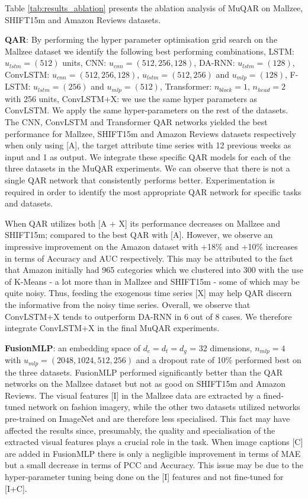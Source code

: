 \documentclass{article}
\begin{document}
Table \ref{tab:results_ablation} presents the ablation analysis of MuQAR on Mallzee, SHIFT15m and Amazon Reviews datasets. 

\textbf{QAR}: By performing the hyper parameter optimisation grid search on the Mallzee dataset we identify the following best performing combinations, LSTM: $u_{lstm}=(512)$ units, CNN: $u_{cnn}=(512, 256, 128)$, DA-RNN: $u_{lstm}=(128)$, ConvLSTM: $u_{cnn}=(512, 256, 128)$, $u_{lstm}=(512, 256)$ and $u_{mlp}=(128)$, F-LSTM: $u_{lstm}=(256)$ and $u_{mlp}=(512)$, Transformer: $n_{block}=1$, $n_{head}=2$ with 256 units, ConvLSTM+X: we use the same hyper parameters as ConvLSTM.
We apply the same hyper-parameters on the rest of the datasets.
The CNN, ConvLSTM and Transformer QAR networks yielded the best performance for Mallzee, SHIFT15m and Amazon Reviews datasets respectively when only using [A], the target attribute time series with 12 previous weeks as input and 1 as output. 
We integrate these specific QAR models for each of the three datasets in the MuQAR experiments. We can observe that there is not a single QAR network that consistently performs better. Experimentation is required in order to identify the most appropriate QAR network for specific tasks and datasets.

When QAR utilizes both [A + X] its performance decreases on Mallzee and SHIFT15m; compared to the best QAR with [A].
However, we observe an impressive improvement on the Amazon dataset with +18\% and +10\% increases in terms of Accuracy and AUC respectively. 
This may be attributed to the fact that Amazon initially had 965 categories which we clustered into 300 with the use of K-Means - a lot more than in Mallzee and SHIFT15m - some of which may be quite noisy. Thus, feeding the exogenous time series [X] may help QAR discern the informative from the noisy time series.
Overall, we observe that ConvLSTM+X tends to outperform DA-RNN in 6 out of 8 cases. We therefore integrate ConvLSTM+X in the final MuQAR experiments.

\textbf{FusionMLP}: an embedding space of $d_c=d_t=d_g$ = 32 dimensions, $n_{mlp}=4$ with $u_{mlp}=(2048, 1024, 512, 256)$ and a dropout rate of 10\% performed best on the three datasets.
FusionMLP performed significantly better than the QAR networks on the Mallzee dataset but not as good on SHIFT15m and Amazon Reviews.
The visual features [I] in the Mallzee data are extracted by a fined-tuned network on fashion imagery, while the other two datasets utilized networks pre-trained on ImageNet and are therefore less specialised. This fact may have affected the results since, presumably, the quality and specialisation of the extracted visual features plays a crucial role in the task.
When image captions [C] are added in FusionMLP there is only a negligible improvement in terms of MAE but a small decrease in terms of PCC and Accuracy. This issue may be due to the hyper-parameter tuning being done on the [I] features and not fine-tuned for [I+C].
\end{document}

